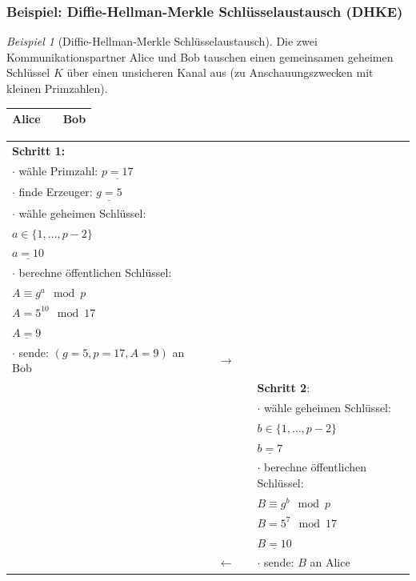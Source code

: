 \documentclass[
  a4paper,
  11pt,
]{scrartcl}
\theoremstyle{plain}
\theoremstyle{definition}
\theoremstyle{remark}
\newtheorem{beispiel}{Beispiel}
\begin{document}
\subsubsection{Beispiel: Diffie-Hellman-Merkle Schlüsselaustausch (DHKE)}
\label{sub:dhke_beispiel}
\begin{beispiel}[Diffie-Hellman-Merkle Schlüsselaustausch]\label{bsp:dhke}
Die zwei Kommunikationspartner Alice und Bob tauschen einen gemeinsamen geheimen Schlüssel $K$ über einen unsicheren Kanal aus (zu Anschauungszwecken mit kleinen Primzahlen).
	\begin{center}
	    \begin{tabularx}{\textwidth}{lXr}
	    	\textbf{Alice} & \text{ } & \textbf{Bob}\\\midrule
	    \end{tabularx}
	    \begin{tabularx}{\textwidth}{lXcXl}
	    	\textbf{Schritt 1:} & & & & \\
	    	$\cdot$ wähle Primzahl: $\underline{p = 17}$ & & & & \\
	    	$\cdot$ finde Erzeuger: $\underline{g = 5}$ & & & & \\
	    	$\cdot$ wähle geheimen Schlüssel: & & & & \\
	    	$a \in \{1, \dots, p-2\}$ & & & & \\
	    	$\underline{a = 10}$ & & & & \\
	    	$\cdot$ berechne öffentlichen Schlüssel: & & & & \\
	    	$A \equiv g^a \mod p$ & & & & \\
	    	$A = 5^{10} \mod 17$ & & & & \\
	    	$\underline{A = 9}$ & & & & \\
	    	$\cdot$ sende: $(g = 5, p = 17, A = 9)$ an Bob & & $\to$ & & \\\midrule
	    	& & & & \textbf{Schritt 2}:\\
	    	& & & & $\cdot$ wähle geheimen Schlüssel:\\
	    	& & & & $b \in \{1, \dots, p-2\}$\\
			& & & & $\underline{b=7}$\\
	    	& & & & $\cdot$ berechne öffentlichen Schlüssel:\\
	    	& & & & $B \equiv g^b \mod p$\\
	    	& & & & $B = 5^7 \mod 17$\\
	    	& & & & $\underline{B = 10}$\\
	    	& & $\leftarrow$ & & $\cdot$ sende: $B$ an Alice\\\midrule

\end{tabularx}
\end{center}
\end{beispiel}
\end{document}
